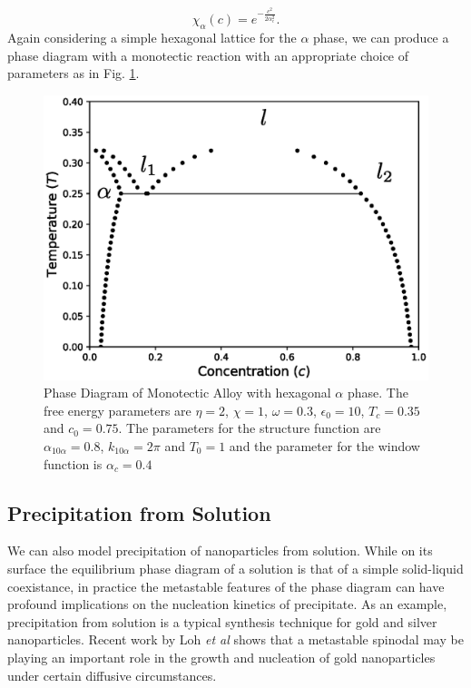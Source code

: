 \documentclass[showkeys, prb, reprint]{revtex4-1}
\newcommand{\f}{\frac}
\begin{document}
\begin{equation}
    \chi_\alpha(c) = e^{-\f{c^2}{2\alpha_c^2}}.
\end{equation}
Again considering a simple hexagonal lattice for the $\alpha$ phase, we can produce a phase diagram with a monotectic reaction with an appropriate choice of parameters as in Fig. \ref{monotectic}. 
\begin{figure}
	\includegraphics[scale=0.5]{monotectic.eps}
	\caption{\label{monotectic} Phase Diagram of Monotectic Alloy with hexagonal $\alpha$ phase. The free energy parameters are $\eta = 2$, $\chi=1$, $\omega=0.3$, $\epsilon_0 = 10$, $T_c = 0.35$ and $c_0 = 0.75$. The parameters for the structure function are $\alpha_{10\alpha} = 0.8$, $k_{10\alpha} = 2\pi$ and $T_0 = 1$ and the parameter for the window function is $\alpha_c = 0.4$}
\end{figure}

\subsection{Precipitation from Solution}

We can also model precipitation of nanoparticles from solution. While on its surface the equilibrium phase diagram of a solution is that of a simple solid-liquid coexistance, in practice the metastable features of the phase diagram can have profound implications on the nucleation kinetics of precipitate. As an example, precipitation from solution is a typical synthesis technique for gold and silver nanoparticles. Recent work by Loh \textit{et al} shows that a metastable spinodal may be playing an important role in the growth and nucleation of gold nanoparticles under certain diffusive circumstances.
\end{document}
